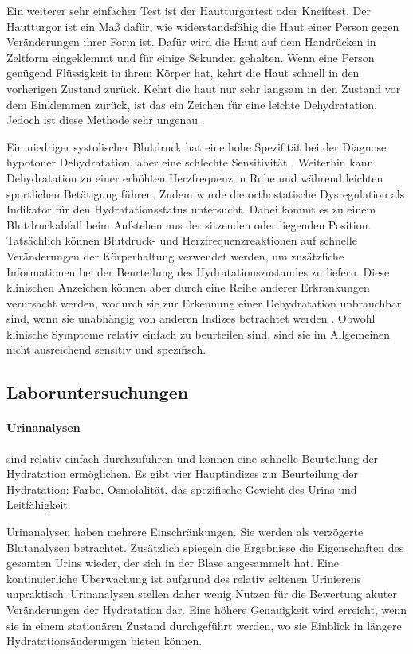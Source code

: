 \documentclass[10pt,a4paper,headinclude,twoside, plainheadsepline, open=right, numbers=noenddot, twocolumn]{article}
\begin{document}
Ein weiterer sehr einfacher Test ist der Hautturgortest oder Kneiftest. 
Der Hautturgor ist ein Maß dafür, wie widerstandsfähig die Haut einer Person gegen Veränderungen ihrer Form ist.
Dafür wird die Haut auf dem Handrücken in Zeltform eingeklemmt und für einige Sekunden gehalten.
Wenn eine Person genügend Flüssigkeit in ihrem Körper hat, kehrt die Haut schnell in den vorherigen Zustand zurück.
Kehrt die haut nur sehr langsam in den Zustand vor dem Einklemmen zurück, ist das ein Zeichen für eine leichte Dehydratation.
Jedoch ist diese Methode sehr ungenau \cite{suryadevara2015towards}.

Ein niedriger systolischer Blutdruck hat eine hohe Spezifität bei der Diagnose hypotoner Dehydratation, aber eine schlechte Sensitivität \cite{fortes2015elderly}.
Weiterhin kann Dehydratation zu einer erhöhten Herzfrequenz in Ruhe und während leichten sportlichen Betätigung führen.
Zudem wurde die orthostatische Dysregulation als Indikator für den Hydratationsstatus untersucht. 
Dabei kommt es zu einem Blutdruckabfall beim Aufstehen aus der sitzenden oder liegenden Position.
Tatsächlich können Blutdruck- und Herzfrequenzreaktionen auf schnelle Veränderungen der Körperhaltung verwendet werden, um zusätzliche Informationen bei der Beurteilung des Hydratationszustandes zu liefern.
Diese klinischen Anzeichen können aber durch eine Reihe anderer Erkrankungen verursacht werden, wodurch sie zur Erkennung einer Dehydratation unbrauchbar sind, wenn sie unabhängig von anderen Indizes betrachtet werden \cite{garret2018engineering, kavouras2002assessing, davis1997effect}.
Obwohl klinische Symptome relativ einfach zu beurteilen sind, sind sie im Allgemeinen nicht ausreichend sensitiv und spezifisch.

\subsection{Laboruntersuchungen}
\label{laboruntersuchungen}

\paragraph{Urinanalysen} sind relativ einfach durchzuführen und können eine schnelle Beurteilung der Hydratation ermöglichen.
Es gibt vier Hauptindizes zur Beurteilung der Hydratation: Farbe, Osmolalität, das spezifische Gewicht des Urins und Leitfähigkeit.

Urinanalysen haben mehrere Einschränkungen.
Sie werden als verzögerte Blutanalysen betrachtet.
Zusätzlich spiegeln die Ergebnisse die Eigenschaften des gesamten Urins wieder, der sich in der Blase angesammelt hat.
Eine kontinuierliche Überwachung ist aufgrund des relativ seltenen Urinierens unpraktisch.
Urinanalysen stellen daher wenig Nutzen für die Bewertung akuter Veränderungen der Hydratation dar.
Eine höhere Genauigkeit wird erreicht, wenn sie in einem stationären Zustand durchgeführt werden, wo sie Einblick in längere Hydratationsänderungen bieten können.
\end{document}
